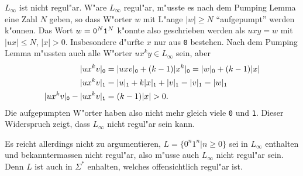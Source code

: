 \begin{loesung}
\begin{teilaufgaben}
\item $L_\infty$ ist nicht regul"ar. W"are $L_\infty$ regul"ar,
m"usste es nach dem Pumping Lemma eine Zahl $N$ geben, so dass
W"orter $w$ mit L"ange $|w|\ge N$ ``aufgepumpt'' werden k"onnen.
Das Wort $w={\tt 0}^N{\tt 1}^N$ k"onnte also geschrieben werden
als $uxy=w$ mit $|ux|\le N$, $|x|>0$. Insbesondere d"urfte $x$ nur
aus {\tt 0} bestehen. Nach dem Pumping Lemma m"ussten auch alle
W"orter $ux^ky\in L_\infty$ sein, aber
\begin{align*}
|ux^kv|_{\tt 0}
&=
|uxv|_{\tt 0}
+
(k-1) |x^k|_{\tt 0}
=
|w|_0+(k-1)|x|
\\
|ux^kv|_{\tt 1}
&=
|u|_{\tt 1} + k|x|_{\tt 1} + |v|_{\tt 1}
=
|v|_{\tt 1}
=|w|_{\tt 1}
\\
|ux^kv|_{\tt 0}
-
|ux^kv|_{\tt 1}
&=
(k-1)|x|>0.
\end{align*}
Die aufgepumpten W"orter haben also nicht mehr gleich viele
{\tt 0} und {\tt 1}. Dieser Widerspruch zeigt, dass $L_\infty$
nicht regul"ar sein kann.

Es reicht allerdings nicht zu argumentieren, $L=\{ 0^n1^n|n \ge 0\}$
sei in $L_\infty$ enthalten und bekanntermassen nicht regul"ar,
also m"usse auch $L_\infty$ nicht regul"ar sein. Denn $L$ ist auch
in $\Sigma^*$ enhalten, welches offensichtlich regul"ar ist.
\qedhere
\end{teilaufgaben}
\end{loesung}


